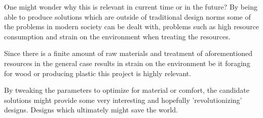 One might wonder why this is relevant in current time or in the future? By being
able to produce solutions which are outside of traditional design norms some of
the problems in modern society can be dealt with, problems such as high resource
consumption and strain on the environment when treating the resources.

Since there is a finite amount of raw materials and treatment of aforementioned
resources in the general case results in strain on the environment be it
foraging for wood or producing plastic this project is highly relevant.


By tweaking the parameters to optimize for material or comfort, the candidate
solutions might provide some very interesting and hopefully 'revolutionizing'
designs. Designs which ultimately might save the world.
